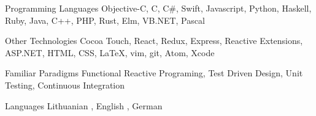 

\begin{cvskills}

  \cvskill
    {Programming Languages} %
    {Objective-C, C, C\#, Swift, Javascript, Python, Haskell, Ruby, Java, C++, PHP, Rust, Elm, VB.NET, Pascal} %

  \cvskill
    {Other Technologies} %
    {Cocoa Touch, React, Redux, Express, Reactive Extensions, ASP.NET, HTML, CSS, LaTeX, vim, git, Atom, Xcode} %

  \cvskill
    {Familiar Paradigms} %
    {Functional Reactive Programing, Test Driven Design, Unit Testing, Continuous Integration} %

  \cvskill
    {Languages} %
    {Lithuanian \textit{\color{gray}{(native)}}, English \textit{\color{gray}{(bilingual)}}, German \textit{\color{gray}{(basic)}}} %

\end{cvskills}
